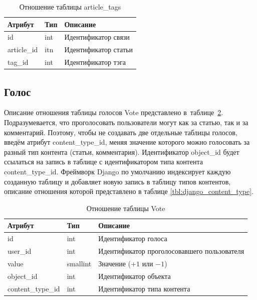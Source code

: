 \begin{table}[H]
	\centering
	\caption{Отношение таблицы article\_tags}
	\label{tbl:myblog_article_tags}
	\begin{tabular}{|l|l|l|}
		\hline
		\textbf{Атрибут} & \textbf{Тип} & \textbf{Описание}    \\ \hline
		id               & int          & Идентификатор связи  \\ \hline
		article\_id      & itn          & Идентификатор статьи \\ \hline
		tag\_id          & int          & Идентификатор тэга   \\ \hline
	\end{tabular}
\end{table}

\subsection{Голос}

Описание отношения таблицы голосов Vote представлено в~таблице~\ref{tbl:myblog_vote}.
Подразумевается, что проголосовать пользователи могут как за статью, так и за комментарий.
Поэтому, чтобы не создавать две отдельные таблицы голосов, введём атрибут content\_type\_id, меняя значение которого можно голосовать за разный тип контента (статьи, комментария).
Идентификатор object\_id будет ссылаться на запись в таблице с идентификатором типа контента content\_type\_id.
Фреймворк Django по умолчанию индексирует каждую созданную таблицу и добавляет новую запись в таблицу типов контентов, описание отношения которой представлено в таблице \ref{tbl:django_content_type}.

\begin{table}[H]
	\centering
	\caption{Отношение таблицы Vote}
	\label{tbl:myblog_vote}
	\begin{tabular}{|l|l|l|}
		\hline
		\textbf{Атрибут}  & \textbf{Тип} & \textbf{Описание}                           \\ \hline
		id                & int          & Идентификатор голоса                        \\ \hline
		user\_id          & int          & Идентификатор проголосовавшего пользователя \\ \hline
		value             & smallint     & Значение ($+1$ или $-1$)                    \\ \hline
		object\_id        & int          & Идентификатор объекта                       \\ \hline
		content\_type\_id & int          & Идентификатор типа контента                 \\ \hline
	\end{tabular}
\end{table}

